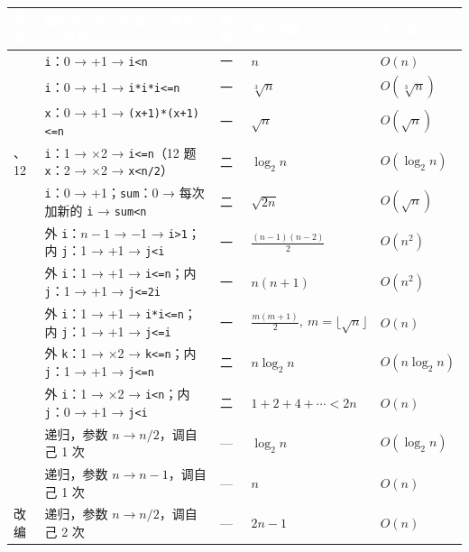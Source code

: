 \documentclass[10.5pt,a4paper,oneside]{article}
\begin{document}
{
\begin{xltabular}{\linewidth}{>{\hsize\raggedright\arraybackslash}X>{\hsize\raggedright\arraybackslash}X>{\hsize\raggedright\arraybackslash}X>{\hsize\raggedright\arraybackslash}X>{\hsize\raggedright\arraybackslash}X}
\textcolor{white}{\bfseries 例题} & \textcolor{white}{\bfseries 每层怎么变（初值 → 每次 → 条件）} & \textcolor{white}{\bfseries 类型} & \textcolor{white}{\bfseries 执行次数} & \textcolor{white}{\bfseries 复杂度} \\
 & \texttt{i}：0 → +1 → \texttt{i\textless{}n} & 一 & \(n\) & \(O(n)\) \\  & \texttt{i}：0 → +1 → \texttt{i*i*i\textless{}=n} & 一 & \(\sqrt[3]{n}\) & \(O(\sqrt[3]{n})\) \\  & \texttt{x}：0 → +1 → \texttt{(x+1)*(x+1)\textless{}=n} & 一 & \(\sqrt n\) & \(O(\sqrt n)\) \\ 、12 & \texttt{i}：1 → ×2 → \texttt{i\textless{}=n}（12 题 \texttt{x}：2 → ×2 → \texttt{x\textless{}n/2}） & 二 & \(\log_2 n\) & \(O(\log_2 n)\) \\  & \texttt{i}：0 → +1；\texttt{sum}：0 → 每次加新的 \texttt{i} → \texttt{sum\textless{}n} & 二 & \(\sqrt{2n}\) & \(O(\sqrt n)\) \\  & 外 \texttt{i}：\(n-1\) → −1 → \texttt{i\textgreater{}1}；内 \texttt{j}：1 → +1 → \texttt{j\textless{}i} & 一 & \(\frac{(n-1)(n-2)}2\) & \(O(n^2)\) \\  & 外 \texttt{i}：1 → +1 → \texttt{i\textless{}=n}；内 \texttt{j}：1 → +1 → \texttt{j\textless{}=2i} & 一 & \(n(n+1)\) & \(O(n^2)\) \\  & 外 \texttt{i}：1 → +1 → \texttt{i*i\textless{}=n}；内 \texttt{j}：1 → +1 → \texttt{j\textless{}=i} & 一 & \(\frac{m(m+1)}2,\ m=\lfloor\sqrt n\rfloor\) & \(O(n)\) \\  & 外 \texttt{k}：1 → ×2 → \texttt{k\textless{}=n}；内 \texttt{j}：1 → +1 → \texttt{j\textless{}=n} & 二 & \(n\log_2 n\) & \(O(n\log_2 n)\) \\  & 外 \texttt{i}：1 → ×2 → \texttt{i\textless{}n}；内 \texttt{j}：0 → +1 → \texttt{j\textless{}i} & 二 & \(1+2+4+\cdots<2n\) & \(O(n)\) \\  & 递归，参数 \(n\to n/2\)，调自己 1 次 & --- & \(\log_2 n\) & \(O(\log_2 n)\) \\  & 递归，参数 \(n\to n-1\)，调自己 1 次 & --- & \(n\) & \(O(n)\) \\  改编 & 递归，参数 \(n\to n/2\)，调自己 2 次 & --- & \(2n-1\) & \(O(n)\) \\ \hline
\end{xltabular}\par\vspace{4pt}}
\end{document}
